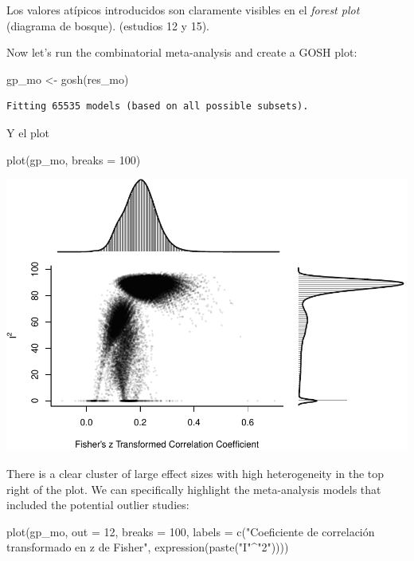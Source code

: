 \documentclass[
  bookmarksnumbered]{article}
\newenvironment{Shaded}{\begin{snugshade}}{\end{snugshade}}
\newcommand{\AttributeTok}[1]{\textcolor[rgb]{0.00,0.34,0.68}{#1}}
\newcommand{\DecValTok}[1]{\textcolor[rgb]{0.69,0.50,0.00}{#1}}
\newcommand{\FunctionTok}[1]{\textcolor[rgb]{0.39,0.29,0.61}{#1}}
\newcommand{\NormalTok}[1]{\textcolor[rgb]{0.12,0.11,0.11}{#1}}
\newcommand{\OtherTok}[1]{\textcolor[rgb]{0.00,0.43,0.16}{#1}}
\newcommand{\SpecialCharTok}[1]{\textcolor[rgb]{0.24,0.68,0.91}{#1}}
\newcommand{\StringTok}[1]{\textcolor[rgb]{0.75,0.01,0.01}{#1}}
\begin{document}
Los valores atípicos introducidos son claramente visibles en el \emph{forest plot} (diagrama de bosque). (estudios 12 y 15).

Now let's run the combinatorial meta-analysis and create a GOSH plot:

\begin{Shaded}
\begin{Highlighting}[]
\NormalTok{gp\_mo }\OtherTok{\textless{}{-}} \FunctionTok{gosh}\NormalTok{(res\_mo)}
\end{Highlighting}
\end{Shaded}

\begin{verbatim}
Fitting 65535 models (based on all possible subsets).
\end{verbatim}

Y el plot

\begin{Shaded}
\begin{Highlighting}[]
\FunctionTok{plot}\NormalTok{(gp\_mo, }\AttributeTok{breaks =} \DecValTok{100}\NormalTok{)}
\end{Highlighting}
\end{Shaded}

\includegraphics{Meta-analysis_files/figure-latex/unnamed-chunk-32-1.pdf}

There is a clear cluster of large effect sizes with high heterogeneity in the top right of the plot. We can specifically highlight the meta-analysis models that included the potential outlier studies:

\begin{Shaded}
\begin{Highlighting}[]
\FunctionTok{plot}\NormalTok{(gp\_mo, }\AttributeTok{out =} \DecValTok{12}\NormalTok{, }\AttributeTok{breaks =} \DecValTok{100}\NormalTok{,}
     \AttributeTok{labels =} \FunctionTok{c}\NormalTok{(}\StringTok{"Coeficiente de correlación transformado en z de Fisher"}\NormalTok{, }
                \FunctionTok{expression}\NormalTok{(}\FunctionTok{paste}\NormalTok{(}\StringTok{"I"}\SpecialCharTok{\^{}}\StringTok{"2"}\NormalTok{))))}
\end{Highlighting}
\end{Shaded}
\end{document}

